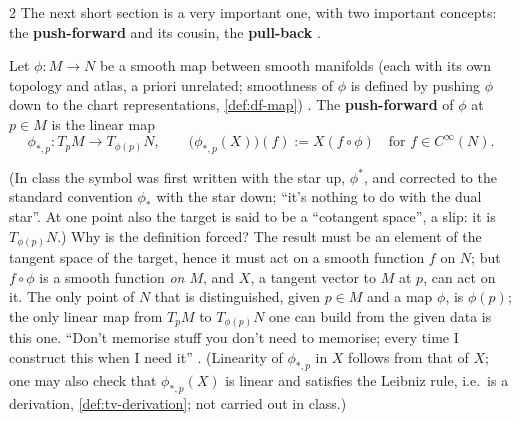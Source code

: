 \begin{paracol}{2}
The next short section is a very important one, with two important concepts: the \textbf{push-forward} and its cousin, the \textbf{pull-back}   .
\begin{definition}\label{def:tb-push}
Let $\phi\colon M\to N$ be a smooth map between smooth manifolds (each with its own topology and atlas, a priori unrelated; smoothness of $\phi$ is defined by pushing $\phi$ down to the chart representations, \cref{def:df-map})   .
The \textbf{push-forward} of $\phi$ at $p\in M$ is the linear map
\[
  \phi_{*,p}\colon T_pM\longrightarrow T_{\phi(p)}N,\qquad\bigl(\phi_{*,p}(X)\bigr)(f):=X(f\circ\phi)\quad\text{for }f\in C^\infty(N).
\]
\end{definition}
(In class the symbol was first written with the star up, $\phi^*$, and corrected to the standard convention $\phi_*$ with the star down; ``it's nothing to do with the dual star''. At one point also the target is said to be a ``cotangent space'', a slip: it is $T_{\phi(p)}N$.)
Why is the definition forced? The result must be an element of the tangent space of the target, hence it must act on a smooth function $f$ on $N$; but $f\circ\phi$ is a smooth function \emph{on $M$}, and $X$, a tangent vector to $M$ at $p$, can act on it. The only point of $N$ that is distinguished, given $p\in M$ and a map $\phi$, is $\phi(p)$; the only
linear map from $T_pM$ to $T_{\phi(p)}N$ one can build from the given data is this one. ``Don't memorise stuff you don't need to memorise; every time I construct this when I need it''      .
(Linearity of $\phi_{*,p}$ in $X$ follows from that of $X$; one may also check that $\phi_{*,p}(X)$ is linear and satisfies the Leibniz rule, i.e.\ is a derivation, \cref{def:tv-derivation}; not carried out in class.)


\end{paracol}
